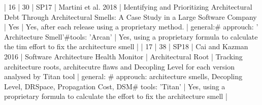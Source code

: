 | 16 |         30 | SP17 | Martini et al. 2018                                                  | Identifying and Prioritizing Architectural Debt Through Architectural Smells: A Case Study in a Large Software Company                                                   | Yes                                                                                                                                                                                                                                                      | Yes, after each release using a proprietary method.                                                                                                                                                                                                                | general:# approuch: ' Architecture Smell'#tools: 'Arcan'                                                                                                                                                                                                                                                 | Yes, using a proprietary formula to calculate the tim effort to fix the architecture smell                                                                                                                                                                                                                                                                                                                                                                                               |
| 17 |         38 | SP18 | Cai and Kazman 2016                                                  | Software Architecture Health Monitor                                                                                                                                     | Architectural Root                                                                                                                                                                                                                                       | Tracking architecture roots, architecutre flaws and Decopling Level for each version analysed by Titan tool                                                                                                                                                        | general: # approuch: architecture smells, Decopling Level, DRSpace, Propagation Cost, DSM# tools: 'Titan'                                                                                                                                                                                                | Yes, using a proprietary formula to calculate the effort to fix the architecture smell                                                                                                                                                                                                                                                                                                                                                                                                   |
